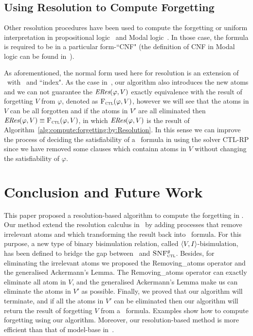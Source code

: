 \documentclass[letterpaper]{article} %
\begin{document}
\subsection{Using Resolution to Compute Forgetting}
Other resolution procedures have been used to compute the forgetting or uniform interpretation in propositional logic~\cite{Yisong:2015:arx} and Modal logic~\cite{herzig2008uniform}. In those case, the formula is required to be in a particular form-``CNF" (the definition of CNF in Modal logic can be found in~\cite{herzig2008uniform}).


As aforementioned, the normal form used here for resolution is an extension of \CTL\ with \start\ and ``index". 
As the case in~\cite{zhao2018automated}, our algorithm also introduces the new atoms and we can not guarantee the $\emph{ERes}(\varphi,V)$ exactly equivalence with the result of forgetting $V$ from $\varphi$, denoted as ${\textsc{F}_{\textsc{ctl}}}(\varphi, V)$, however we will see that the atoms in $V$ can be all forgotten and if the atoms in $V'$ are all eliminated then $\emph{ERes}(\varphi,V) \equiv {\textsc{F}_{\textsc{ctl}}}(\varphi, V)$, in which $\emph{ERes}(\varphi,V)$ is the result of Algorithm~\ref{alg:compute:forgetting:by:Resolution}. In this sense we can improve the process of deciding the satisfiability of a \CTL\ formula in using the solver CTL-RP since we have removed some clauses which containn atoms in $V$ without changing the satisfiability of $\varphi$.



\section{Conclusion and Future Work}
This paper proposed a resolution-based algorithm to compute the forgetting in \CTL.
Our method extend the resolution calculus in~\cite{zhang2014resolution} by adding processes that remove  irrelevant atoms and which transforming the result back into \CTL\ formula.
For this purpose, a new type of binary bisimulation relation, called ${\langle{V,I}\rangle}$-bisimulation, has been defined to bridge the gap between \CTL\ and ${\textsc{SNF}_{\textsc{ctl}}^g}$. Besides, for eliminating the irrelevant atoms we proposed the Removing\_atoms operator and the generalised Ackermann’s Lemma. The Removing\_atoms operator can exactly eliminate all atom in $V$, and the generalised Ackermann’s Lemma make us can eliminate the atoms in $V'$ as possible.
Finally, we proved that our algorithm will terminate, and if all the atoms in $V'$ can be eliminated then our algorithm will return the result of forgetting $V$ from a \CTL\ formula.
Examples show how to compute forgetting using our algorithm.
Moreover, our resolution-based method is more efficient than that of model-base in~\cite{renyansfirstpaper}.
\end{document}
